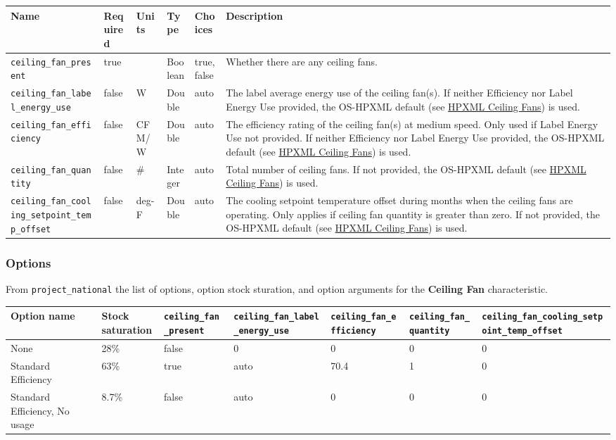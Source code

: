 \begin{longtable}[]{@{}llllll@{}}
\toprule\noalign{}
Name & Required & Units & Type & Choices & Description \\
\midrule\noalign{}
\endhead
\bottomrule\noalign{}
\endlastfoot
\texttt{ceiling\_fan\_present} & true & & Boolean & true, false &
Whether there are any ceiling fans. \\
\texttt{ceiling\_fan\_label\_energy\_use} & false & W & Double & auto &
The label average energy use of the ceiling fan(s). If neither
Efficiency nor Label Energy Use provided, the OS-HPXML default (see
\href{https://openstudio-hpxml.readthedocs.io/en/v1.7.0/workflow_inputs.html\#hpxml-ceiling-fans}{HPXML
Ceiling Fans}) is used. \\
\texttt{ceiling\_fan\_efficiency} & false & CFM/W & Double & auto & The
efficiency rating of the ceiling fan(s) at medium speed. Only used if
Label Energy Use not provided. If neither Efficiency nor Label Energy
Use provided, the OS-HPXML default (see
\href{https://openstudio-hpxml.readthedocs.io/en/v1.7.0/workflow_inputs.html\#hpxml-ceiling-fans}{HPXML
Ceiling Fans}) is used. \\
\texttt{ceiling\_fan\_quantity} & false & \# & Integer & auto & Total
number of ceiling fans. If not provided, the OS-HPXML default (see
\href{https://openstudio-hpxml.readthedocs.io/en/v1.7.0/workflow_inputs.html\#hpxml-ceiling-fans}{HPXML
Ceiling Fans}) is used. \\
\texttt{ceiling\_fan\_cooling\_setpoint\_temp\_offset} & false & deg-F &
Double & auto & The cooling setpoint temperature offset during months
when the ceiling fans are operating. Only applies if ceiling fan
quantity is greater than zero. If not provided, the OS-HPXML default
(see
\href{https://openstudio-hpxml.readthedocs.io/en/v1.7.0/workflow_inputs.html\#hpxml-ceiling-fans}{HPXML
Ceiling Fans}) is used. \\
\end{longtable}

\subsubsection{Options}\label{options-10}

From \texttt{project\_national} the list of options, option stock
sturation, and option arguments for the \textbf{Ceiling Fan}
characteristic.

\begin{longtable}[]{@{}lllllll@{}}
\toprule\noalign{}
Option name & Stock saturation & \texttt{ceiling\_fan\_present} &
\texttt{ceiling\_fan\_label\_energy\_use} &
\texttt{ceiling\_fan\_efficiency} & \texttt{ceiling\_fan\_quantity} &
\texttt{ceiling\_fan\_cooling\_setpoint\_temp\_offset} \\
\midrule\noalign{}
\endhead
\bottomrule\noalign{}
\endlastfoot
None & 28\% & false & 0 & 0 & 0 & 0 \\
Standard Efficiency & 63\% & true & auto & 70.4 & 1 & 0 \\
Standard Efficiency, No usage & 8.7\% & false & auto & 0 & 0 & 0 \\
\end{longtable}

